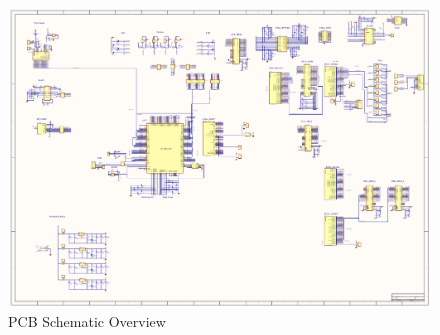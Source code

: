 \begin{figure}[h]
  \centering
  \includegraphics[width=\textwidth]{fig/pcb/schematics/pcbschematic.pdf}
  \caption{PCB Schematic Overview}
  \label{fig:schematic-pcb}
\end{figure}
